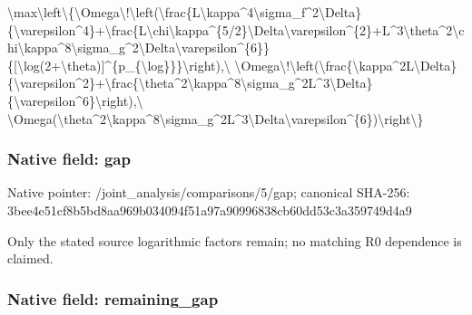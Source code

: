 \documentclass[10pt,a4paper]{article}
\begin{document}
\textbackslash{}max\textbackslash{}left\textbackslash{}\{\textbackslash{}Omega\textbackslash{}!\textbackslash{}left\allowbreak{}(\textbackslash{}frac\{L\textbackslash{}kappa\textasciicircum{}4\textbackslash{}sigma\_f\allowbreak{}\textasciicircum{}2\textbackslash{}Delta\}\{\textbackslash{}varepsilon\textasciicircum{}4\}\allowbreak{}+\textbackslash{}frac\{L\textbackslash{}chi\textbackslash{}kappa\textasciicircum{}\{5/2\}\allowbreak{}\textbackslash{}Delta\textbackslash{}varepsilon\textasciicircum{}\{2\}+L\allowbreak{}\textasciicircum{}3\textbackslash{}theta\textasciicircum{}2\textbackslash{}chi\textbackslash{}kappa\textasciicircum{}8\textbackslash{}s\allowbreak{}igma\_g\textasciicircum{}2\textbackslash{}Delta\textbackslash{}varepsilo\allowbreak{}n\textasciicircum{}\{6\}\}\{[\textbackslash{}log(2+\textbackslash{}theta)]\allowbreak{}\textasciicircum{}\{p\_\{\textbackslash{}log\}\}\}\textbackslash{}right),\textbackslash{} \textbackslash{}Omega\textbackslash{}!\textbackslash{}left(\textbackslash{}frac\{\textbackslash{}kap\allowbreak{}pa\textasciicircum{}2L\textbackslash{}Delta\}\{\textbackslash{}varepsilon\allowbreak{}\textasciicircum{}2\}+\textbackslash{}frac\{\textbackslash{}theta\textasciicircum{}2\textbackslash{}kappa\allowbreak{}\textasciicircum{}8\textbackslash{}sigma\_g\textasciicircum{}2L\textasciicircum{}3\textbackslash{}Delta\}\{\textbackslash{}\allowbreak{}varepsilon\textasciicircum{}6\}\textbackslash{}right),\textbackslash{} \textbackslash{}Omega(\textbackslash{}theta\textasciicircum{}2\textbackslash{}kappa\textasciicircum{}8\textbackslash{}\allowbreak{}sigma\_g\textasciicircum{}2L\textasciicircum{}3\textbackslash{}Delta\textbackslash{}varep\allowbreak{}silon\textasciicircum{}\{6\})\textbackslash{}right\textbackslash{}\}


\subsubsection{Native field: gap}


Native pointer: /joint\_analysis/comparisons/5/gap; canonical SHA-256: 3bee4e51cf8b5bd8aa969b03\allowbreak{}4094f51a97a90996838cb60d\allowbreak{}d53c3a359749d4a9


Only the stated source logarithmic factors remain; no matching R0 dependence is claimed.


\subsubsection{Native field: remaining\_gap}
\end{document}
